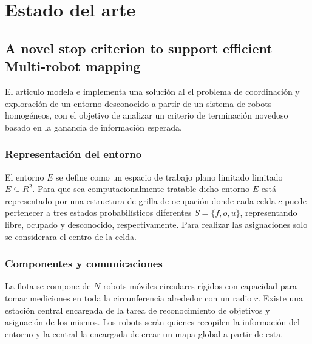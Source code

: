 \section{Estado del arte}

\subsection{A novel stop criterion to support efficient Multi-robot mapping}\cite{amorin2019novel}
El articulo modela e implementa una solución al el problema de coordinación y exploración de un entorno desconocido a partir de un sistema de robots homogéneos, con el objetivo de analizar un criterio de terminación novedoso basado en la ganancia de información esperada.


\subsubsection{Representación del entorno}
El entorno $E$ se define como un espacio de trabajo plano limitado limitado $E\subseteq R^2$. Para que sea computacionalmente tratable dicho entorno $E$ está representado por una estructura de grilla de ocupación donde cada celda $c$ puede pertenecer a tres estados probabilísticos diferentes $S = \{f, o, u\}$, representando libre, ocupado y desconocido, respectivamente. Para realizar las asignaciones solo se considerara el centro de la celda.

\subsubsection{Componentes y comunicaciones}
La flota se compone de $N$ robots móviles circulares rígidos con capacidad para tomar mediciones en toda la circunferencia alrededor con un radio $r$. Existe una estación central encargada de la tarea de reconocimiento de objetivos y asignación de los mismos. Los robots serán quienes recopilen la información del entorno y la central la encargada de crear un mapa global a partir de esta. 

